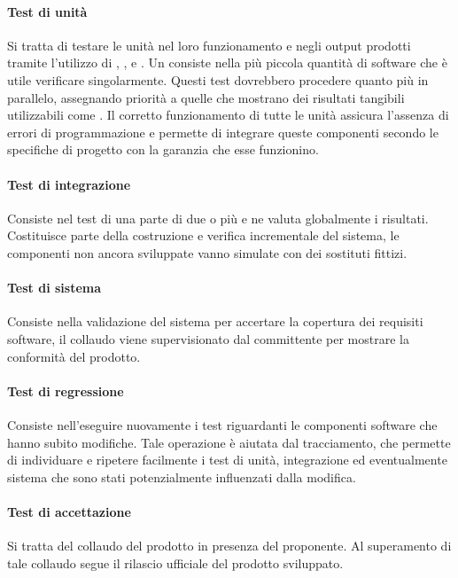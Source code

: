 			\paragraph{Test di unità}
			Si tratta di testare le unità nel loro funzionamento e negli output prodotti tramite l'utilizzo di , , e . Un  consiste nella più piccola quantità di software che è utile verificare singolarmente.
			 Questi test dovrebbero procedere quanto più in parallelo, assegnando priorità a quelle  che mostrano dei risultati tangibili utilizzabili come .
			 Il corretto funzionamento di tutte le unità assicura l'assenza di errori di programmazione e permette di integrare queste componenti secondo le specifiche di progetto con la garanzia che esse funzionino.
			 
			\paragraph{Test di integrazione}
			Consiste nel test di una parte di due o più  e ne valuta globalmente i risultati. Costituisce parte della costruzione e verifica incrementale del sistema, le  componenti non ancora sviluppate vanno simulate con dei sostituti fittizi.
			
			\paragraph{Test di sistema}
			Consiste nella validazione del sistema per accertare la copertura dei requisiti software, il collaudo viene supervisionato dal committente per mostrare la conformità del prodotto.			
			
			\paragraph{Test di regressione}
			Consiste nell'eseguire nuovamente i test riguardanti le componenti software che hanno subito modifiche.	Tale operazione è aiutata dal tracciamento, che permette di individuare e ripetere facilmente i test di unità, integrazione ed eventualmente sistema che sono stati potenzialmente influenzati dalla modifica.		
			
			\paragraph{Test di accettazione}
			Si tratta del collaudo del prodotto in presenza del proponente. Al superamento di tale collaudo segue il rilascio ufficiale del prodotto sviluppato.
			
